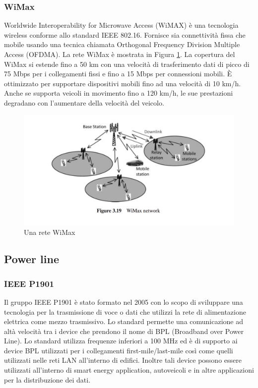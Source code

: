 \subsubsection{WiMax}
Worldwide Interoperability for Microwave Access (WiMAX) è una tecnologia wireless conforme allo standard IEEE 802.16. Fornisce sia connettività fissa che mobile usando una tecnica chiamata Orthogonal Frequency Division Multiple Access (OFDMA). La rete WiMax è mostrata in Figura \ref{fig:wim}. La copertura del WiMax si estende fino a 50 km con una velocità di trasferimento dati di picco di 75 Mbps per i collegamenti fissi e fino a 15 Mbps per connessioni mobili. È ottimizzato per supportare dispositivi mobili fino ad una velocità di 10 km/h. Anche se supporta veicoli in movimento fino a 120 km/h, le sue prestazioni degradano con l'aumentare della velocità del veicolo.
\begin{figure}[h]
	\centering
	\includegraphics[scale=0.350]{imgs/wim.png}
	\caption{Una rete WiMax} \label{fig:wim}
\end{figure}
\subsection{Power line}
\subsubsection{IEEE P1901}
Il gruppo IEEE P1901 è stato formato nel 2005 con lo scopo di sviluppare una tecnologia per la trasmissione di voce o dati che utilizzi la rete di alimentazione elettrica come mezzo trasmissivo. Lo standard permette una comunicazione ad altà velocità tra i device che prendono il nome di BPL (Broadband over Power Line). Lo standard utilizza frequenze inferiori a 100 MHz ed è di supporto ai device BPL utilizzati per i collegamenti first-mile/last-mile così come quelli utilizzati nelle reti LAN all'interno di edifici. Inoltre tali device possono essere utilizzati all'interno di smart energy application, autoveicoli e in altre applicazioni per la distribuzione dei dati.
